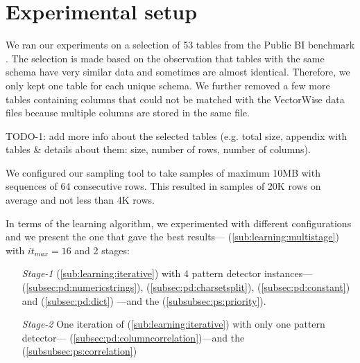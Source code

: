 \section{Experimental setup}
\label{sec:eval:expsetup}


\graphicspath{{6_evaluation/images/}}

% 

We ran our experiments on a selection of 53 tables from the Public BI benchmark \cite{pbib}. The selection is made based on the observation that tables with the same schema have very similar data and sometimes are almost identical. Therefore, we only kept one table for each unique schema. We further removed a few more tables containing columns that could not be matched with the VectorWise data files because multiple columns are stored in the same file.

TODO-1: add more info about the selected tables (e.g. total size, appendix with tables \& details about them: size, number of rows, number of columns).

We configured our sampling tool to take samples of maximum 10MB with sequences of 64 consecutive rows. This resulted in samples of 20K rows on average and not less than 4K rows.

In terms of the learning algorithm, we experimented with different configurations and we present the one that gave the best results--- (\ref{sub:learning:multistage}) with \(it_{max} = 16\) and 2 stages:
\begin{itemize}
    \item[\textit{Stage-1}]  (\ref{sub:learning:iterative}) with 4 pattern detector instances---
     (\ref{subsec:pd:numericstrings}), 
     (\ref{subsec:pd:charsetsplit}), 
     (\ref{subsec:pd:constant}) and 
     (\ref{subsec:pd:dict})
    ---and the  (\ref{subsubsec:ps:priority}).
    \item[\textit{Stage-2}] One iteration of  (\ref{sub:learning:iterative}) with only one pattern detector---     (\ref{subsec:pd:columncorrelation})---and the  (\ref{subsubsec:ps:correlation})
\end{itemize}

